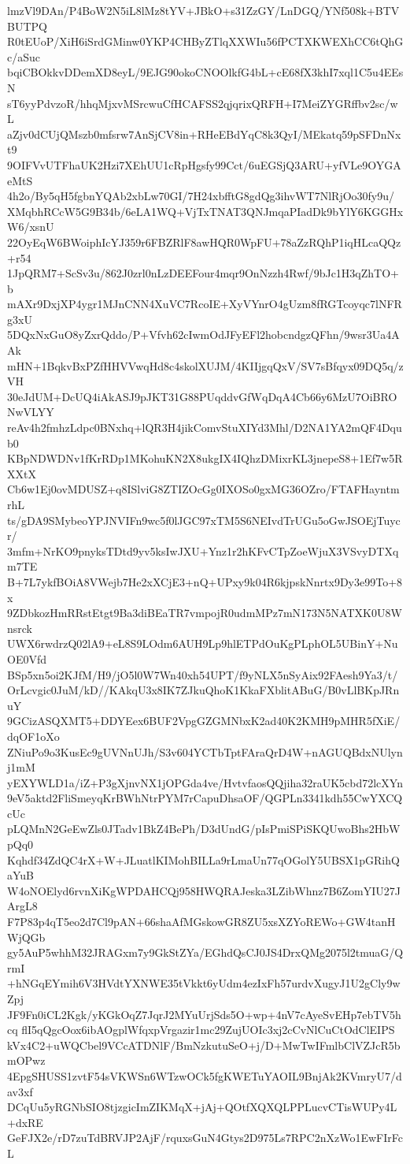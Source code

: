 lmzVl9DAn/P4BoW2N5iL8lMz8tYV+JBkO+s31ZzGY/LnDGQ/YNf508k+BTVBUTPQ
R0tEUoP/XiH6iSrdGMinw0YKP4CHByZTlqXXWIu56fPCTXKWEXhCC6tQhGc/aSuc
bqiCBOkkvDDemXD8eyL/9EJG90okoCNOOlkfG4bL+cE68fX3khI7xql1C5u4EEsN
sT6yyPdvzoR/hhqMjxvMSrcwuCfHCAFSS2qjqrixQRFH+I7MeiZYGRffbv2sc/wL
aZjv0dCUjQMszb0mfsrw7AnSjCV8in+RHeEBdYqC8k3QyI/MEkatq59pSFDnNxt9
9OIFVvUTFhaUK2Hzi7XEhUU1cRpHgsfy99Cct/6uEGSjQ3ARU+yfVLe9OYGAeMtS
4h2o/By5qH5fgbnYQAb2xbLw70GI/7H24xbfftG8gdQg3ihvWT7NlRjOo30fy9u/
XMqbhRCcW5G9B34b/6eLA1WQ+VjTxTNAT3QNJmqaPIadDk9bYlY6KGGHxW6/xsnU
22OyEqW6BWoiphIcYJ359r6FBZRlF8awHQR0WpFU+78aZzRQhP1iqHLcaQQz+r54
1JpQRM7+ScSv3u/862J0zrl0nLzDEEFour4mqr9OnNzzh4Rwf/9bJc1H3qZhTO+b
mAXr9DxjXP4ygr1MJnCNN4XuVC7RcoIE+XyVYnrO4gUzm8fRGTcoyqc7lNFRg3xU
5DQxNxGuO8yZxrQddo/P+Vfvh62cIwmOdJFyEFl2hobcndgzQFhn/9wsr3Ua4AAk
mHN+1BqkvBxPZfHHVVwqHd8c4skolXUJM/4KIIjgqQxV/SV7sBfqyx09DQ5q/zVH
30eJdUM+DcUQ4iAkASJ9pJKT31G88PUqddvGfWqDqA4Cb66y6MzU7OiBRONwVLYY
reAv4h2fmhzLdpc0BNxhq+lQR3H4jikComvStuXIYd3Mhl/D2NA1YA2mQF4Dqub0
KBpNDWDNv1fKrRDp1MKohuKN2X8ukgIX4IQhzDMixrKL3jnepeS8+1Ef7w5RXXtX
Cb6w1Ej0ovMDUSZ+q8ISlviG8ZTIZOcGg0IXOSo0gxMG36OZro/FTAFHayntmrhL
ts/gDA9SMybeoYPJNVIFn9wc5f0lJGC97xTM5S6NEIvdTrUGu5oGwJSOEjTuycr/
3mfm+NrKO9pnyksTDtd9yv5ksIwJXU+Ynz1r2hKFvCTpZoeWjuX3VSvyDTXqm7TE
B+7L7ykfBOiA8VWejb7He2xXCjE3+nQ+UPxy9k04R6kjpskNnrtx9Dy3e99To+8x
9ZDbkozHmRRstEtgt9Ba3diBEaTR7vmpojR0udmMPz7mN173N5NATXK0U8Wnsrck
UWX6rwdrzQ02lA9+eL8S9LOdm6AUH9Lp9hlETPdOuKgPLphOL5UBinY+NuOE0Vfd
BSp5xn5oi2KJfM/H9/jO5l0W7Wn40xh54UPT/f9yNLX5nSyAix92FAesh9Ya3/t/
OrLcvgic0JuM/kD//KAkqU3x8IK7ZJkuQhoK1KkaFXblitABuG/B0vLlBKpJRnuY
9GCizASQXMT5+DDYEex6BUF2VpgGZGMNbxK2ad40K2KMH9pMHR5fXiE/dqOF1oXo
ZNiuPo9o3KusEc9gUVNnUJh/S3v604YCTbTptFAraQrD4W+nAGUQBdxNUlynj1mM
yEXYWLD1a/iZ+P3gXjnvNX1jOPGda4ve/HvtvfaosQQjiha32raUK5cbd72lcXYn
9eV5aktd2FliSmeyqKrBWhNtrPYM7rCapuDhsaOF/QGPLn3341kdh55CwYXCQcUc
pLQMnN2GeEwZls0JTadv1BkZ4BePh/D3dUndG/pIsPmiSPiSKQUwoBhs2HbWpQq0
Kqhdf34ZdQC4rX+W+JLuatlKIMohBILLa9rLmaUn77qOGolY5UBSX1pGRihQaYuB
W4oNOElyd6rvnXiKgWPDAHCQj958HWQRAJeska3LZibWhnz7B6ZomYIU27JArgL8
F7P83p4qT5eo2d7Cl9pAN+66shaAfMGskowGR8ZU5xsXZYoREWo+GW4tanHWjQGb
gy5AuP5whhM32JRAGxm7y9GkStZYa/EGhdQsCJ0JS4DrxQMg2075l2tmuaG/QrmI
+hNGqEYmih6V3HVdtYXNWE35tVkkt6yUdm4ezIxFh57urdvXugyJ1U2gCly9wZpj
JF9Fn0iCL2Kgk/yKGkOqZ7JqrJ2MYuUrjSds5O+wp+4nV7cAyeSvEHp7ebTV5hcq
flI5qQgcOox6ibAOgplWfqxpVrgazir1mc29ZujUOIc3xj2cCvNlCuCtOdClEIPS
kVx4C2+uWQCbel9VCcATDNlF/BmNzkutuSeO+j/D+MwTwIFmlbClVZJcR5bmOPwz
4EpgSHUSS1zvtF54sVKWSn6WTzwOCk5fgKWETuYAOIL9BnjAk2KVmryU7/dav3xf
DCqUu5yRGNbSIO8tjzgicImZIKMqX+jAj+QOtfXQXQLPPLucvCTisWUPy4L+dxRE
GeFJX2e/rD7zuTdBRVJP2AjF/rquxsGuN4Gtys2D975Ls7RPC2nXzWo1EwFIrFcL
